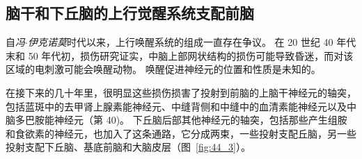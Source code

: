 \subsection{脑干和下丘脑的上行觉醒系统支配前脑}

自\textit{冯$\cdot$伊克诺莫}时代以来，上行唤醒系统的组成一直存在争议。
在 20 世纪 40 年代末和 50 年代初，损伤研究证实，中脑上部网状结构的损伤可能导致昏迷，而对该区域的电刺激可能会唤醒动物。
唤醒促进神经元的位置和性质是未知的。


在接下来的几十年里，很明显这些损伤损害了投射到前脑的上脑干神经元的轴突，包括蓝斑中的去甲肾上腺素能神经元、中缝背侧和中缝中的血清素能神经元以及中脑多巴胺能神经元（第 40)。
下丘脑后部其他神经元的轴突，包括那些产生组胺和食欲素的神经元，也加入了这条通路，它分成两束，一些投射支配丘脑，另一些投射支配下丘脑、基底前脑和大脑皮层（图~\ref{fig:44_3}）。


